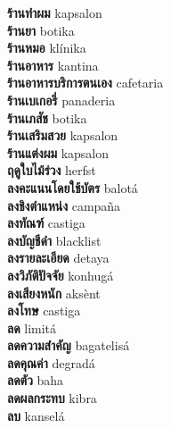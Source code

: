 \textbf{ ร้านทำผม  } kapsalon \\
\textbf{ ร้านยา  } botika \\
\textbf{ ร้านหมอ  } klínika \\
\textbf{ ร้านอาหาร  } kantina \\
\textbf{ ร้านอาหารบริการตนเอง  } cafetaria \\
\textbf{ ร้านเบเกอรี่  } panaderia \\
\textbf{ ร้านเภสัช  } botika \\
\textbf{ ร้านเสริมสวย  } kapsalon \\
\textbf{ ร้านแต่งผม  } kapsalon \\
\textbf{ ฤดูใบไม้ร่วง  } herfst \\
\textbf{ ลงคะแนนโดยใช้บัตร  } balotá \\
\textbf{ ลงชิงตำแหน่ง  } campaña \\
\textbf{ ลงทัณฑ์  } castiga \\
\textbf{ ลงบัญชีดำ  } blacklist \\
\textbf{ ลงรายละเอียด  } detaya \\
\textbf{ ลงวิภัติปัจจัย  } konhugá \\
\textbf{ ลงเสียงหนัก  } aksènt \\
\textbf{ ลงโทษ  } castiga \\
\textbf{ ลด  } limitá \\
\textbf{ ลดความสำคัญ  } bagatelisá \\
\textbf{ ลดคุณค่า  } degradá \\
\textbf{ ลดตัว  } baha \\
\textbf{ ลดผลกระทบ  } kibra \\
\textbf{ ลบ  } kanselá \\
